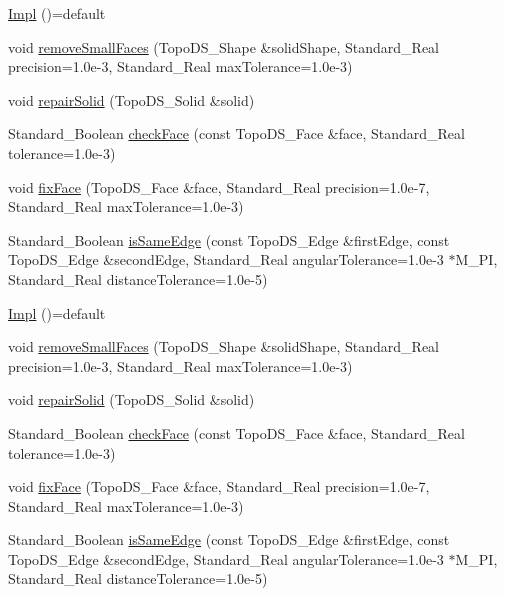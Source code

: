 \begin{DoxyCompactItemize}
\item 
\hyperlink{classMcCAD_1_1Tools_1_1Preprocessor_1_1Impl_a77c4b3a7b8d52e9597c6ee1d7c4aa8e6}{Impl} ()=default
\item 
void \hyperlink{classMcCAD_1_1Tools_1_1Preprocessor_1_1Impl_acb9e9ceb77f52c6894cbf471bfa15a1b}{remove\+Small\+Faces} (Topo\+D\+S\+\_\+\+Shape \&solid\+Shape, Standard\+\_\+\+Real precision=1.\+0e-\/3, Standard\+\_\+\+Real max\+Tolerance=1.\+0e-\/3)
\item 
void \hyperlink{classMcCAD_1_1Tools_1_1Preprocessor_1_1Impl_a388f2f564e20bdc6b0a238d1a2dc89ab}{repair\+Solid} (Topo\+D\+S\+\_\+\+Solid \&solid)
\item 
Standard\+\_\+\+Boolean \hyperlink{classMcCAD_1_1Tools_1_1Preprocessor_1_1Impl_a3bbfdb37f50683f6a216a608ba231e84}{check\+Face} (const Topo\+D\+S\+\_\+\+Face \&face, Standard\+\_\+\+Real tolerance=1.\+0e-\/3)
\item 
void \hyperlink{classMcCAD_1_1Tools_1_1Preprocessor_1_1Impl_a2ca942ed4ba9269d9291000456b6d8dd}{fix\+Face} (Topo\+D\+S\+\_\+\+Face \&face, Standard\+\_\+\+Real precision=1.\+0e-\/7, Standard\+\_\+\+Real max\+Tolerance=1.\+0e-\/3)
\item 
Standard\+\_\+\+Boolean \hyperlink{classMcCAD_1_1Tools_1_1Preprocessor_1_1Impl_ac4e30641e2bfd625b2081fee963b2b03}{is\+Same\+Edge} (const Topo\+D\+S\+\_\+\+Edge \&first\+Edge, const Topo\+D\+S\+\_\+\+Edge \&second\+Edge, Standard\+\_\+\+Real angular\+Tolerance=1.\+0e-\/3 $\ast$\+M\+\_\+\+P\+I, Standard\+\_\+\+Real distance\+Tolerance=1.\+0e-\/5)
\item 
\hyperlink{classMcCAD_1_1Tools_1_1Preprocessor_1_1Impl_a77c4b3a7b8d52e9597c6ee1d7c4aa8e6}{Impl} ()=default
\item 
void \hyperlink{classMcCAD_1_1Tools_1_1Preprocessor_1_1Impl_acb9e9ceb77f52c6894cbf471bfa15a1b}{remove\+Small\+Faces} (Topo\+D\+S\+\_\+\+Shape \&solid\+Shape, Standard\+\_\+\+Real precision=1.\+0e-\/3, Standard\+\_\+\+Real max\+Tolerance=1.\+0e-\/3)
\item 
void \hyperlink{classMcCAD_1_1Tools_1_1Preprocessor_1_1Impl_a388f2f564e20bdc6b0a238d1a2dc89ab}{repair\+Solid} (Topo\+D\+S\+\_\+\+Solid \&solid)
\item 
Standard\+\_\+\+Boolean \hyperlink{classMcCAD_1_1Tools_1_1Preprocessor_1_1Impl_a3bbfdb37f50683f6a216a608ba231e84}{check\+Face} (const Topo\+D\+S\+\_\+\+Face \&face, Standard\+\_\+\+Real tolerance=1.\+0e-\/3)
\item 
void \hyperlink{classMcCAD_1_1Tools_1_1Preprocessor_1_1Impl_a2ca942ed4ba9269d9291000456b6d8dd}{fix\+Face} (Topo\+D\+S\+\_\+\+Face \&face, Standard\+\_\+\+Real precision=1.\+0e-\/7, Standard\+\_\+\+Real max\+Tolerance=1.\+0e-\/3)
\item 
Standard\+\_\+\+Boolean \hyperlink{classMcCAD_1_1Tools_1_1Preprocessor_1_1Impl_ac4e30641e2bfd625b2081fee963b2b03}{is\+Same\+Edge} (const Topo\+D\+S\+\_\+\+Edge \&first\+Edge, const Topo\+D\+S\+\_\+\+Edge \&second\+Edge, Standard\+\_\+\+Real angular\+Tolerance=1.\+0e-\/3 $\ast$\+M\+\_\+\+P\+I, Standard\+\_\+\+Real distance\+Tolerance=1.\+0e-\/5)
\end{DoxyCompactItemize}



